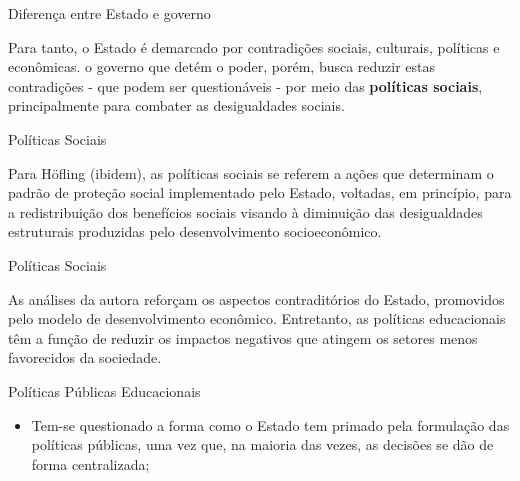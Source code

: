 \documentclass[12pt]{beamer}
\begin{document}
			\begin{frame}{Diferença entre Estado e governo}
				\justifying

				Para tanto, o Estado é demarcado por contradições sociais, culturais, políticas e econômicas. o governo que detém o poder, porém, busca reduzir estas contradições - que podem ser questionáveis - por meio das \textbf{políticas sociais}, principalmente para combater as desigualdades sociais.
			\end{frame}	
	
			\begin{frame}{Políticas Sociais}
				\justifying
		
				Para Höfling (ibidem), as políticas sociais se referem a ações que determinam o padrão de proteção social implementado pelo Estado, voltadas, em princípio, para a redistribuição dos benefícios sociais visando à diminuição das desigualdades estruturais produzidas pelo desenvolvimento socioeconômico.
			\end{frame}
	
			\begin{frame}{Políticas Sociais}
				\justifying
		
				As análises da autora reforçam os aspectos contraditórios do Estado, promovidos pelo modelo de desenvolvimento econômico. Entretanto, as políticas educacionais têm a função de reduzir os impactos negativos que atingem os setores menos favorecidos da sociedade.
			\end{frame}
	
			\begin{frame}{Políticas Públicas Educacionais}
				\justifying
				\begin{itemize}
				\item Tem-se questionado a forma como o Estado tem primado
				pela formulação das políticas públicas, uma vez que, na maioria das vezes, as decisões se dão de forma centralizada;
			
			
				\end{itemize}
			\end{frame}
	
\end{document}
